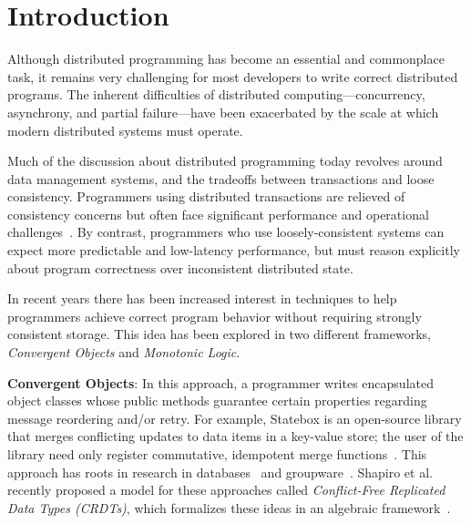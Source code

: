 \section{Introduction} 
\label{sec:intro} 
Although distributed programming has become an essential and commonplace task, it remains very challenging for most developers to write correct distributed programs. The inherent difficulties of distributed computing---concurrency, asynchrony, and partial failure---have been exacerbated by the scale at which modern distributed systems must operate.

Much of the discussion about distributed programming today revolves around data management systems, and the tradeoffs between transactions and loose consistency. Programmers using distributed transactions are relieved of consistency concerns but often face significant performance and operational challenges~\cite{Birman2009}. By contrast, programmers who use loosely-consistent systems can expect more predictable and low-latency performance, but must reason explicitly about program correctness over inconsistent distributed state.

In recent years there has been increased interest in techniques to help programmers achieve correct program behavior without requiring strongly consistent storage. This idea has been explored in two different frameworks, \emph{Convergent Objects} and \emph{Monotonic Logic}.

\vspace{0.5em}
\noindent \textbf{Convergent Objects}: In this approach, a programmer writes encapsulated object classes whose public methods guarantee certain properties regarding message reordering and/or retry. For example, Statebox is an open-source library that merges conflicting updates to data items in a key-value store; the user of the library need only register commutative, idempotent merge functions~\cite{statebox}. This approach has roots in research in databases~\cite{Garcia-Molina1983,Farrag1989,Helland2009} and groupware~\cite{Ellis1989,Sun1998}.  Shapiro et al. recently proposed a model for these approaches called {\em Conflict-Free Replicated Data Types (CRDTs)}, which formalizes these ideas in an algebraic framework~\cite{Shapiro2011b}. 

